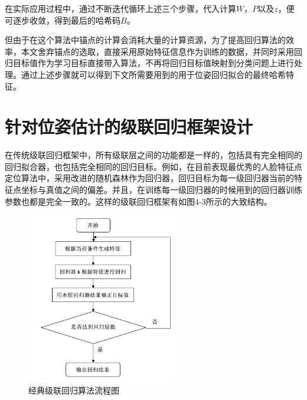 在实际应用过程中，通过不断迭代循环上述三个步骤，代入计算$W$，$P$以及$z$，便可逐步收敛，得到最后的哈希码$B$。

但由于在这个算法中锚点的计算会消耗大量的计算资源，为了提高回归算法的效率，本文舍弃锚点的选取，直接采用原始特征信息作为训练的数据，并同时采用回归目标值作为学习目标直接带入算法，不再将回归目标值映射到分类问题上进行处理。通过上述步骤就可以得到下文所需要用到的用于位姿回归拟合的最终哈希特征。

\section{针对位姿估计的级联回归框架设计}

在传统级联回归框架中，所有级联层之间的功能都是一样的，包括具有完全相同的回归拟合器，也包括完全相同的回归目标。例如，在目前表现最优秀的人脸特征点定位算法中\cite{chen2014joint}，采用改进的随机森林作为回归器，回归目标为每一级回归器当前的特征点坐标与真值之间的偏差。并且，在训练每一级回归器的时候用到的回归器训练参数也都是完全一致的。这样的级联回归框架有如图4-3所示的大致结构。

\begin{figure}[htb]
	\centering 
	\includegraphics[width=0.6\textwidth]{./mypic/经典级联回归算法流程图.jpg} 
	\caption{经典级联回归算法流程图} 
\end{figure}

